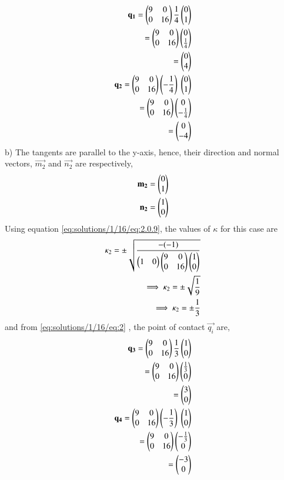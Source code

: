 \begin{align}
    \vec{q_1}=\myvec{9 & 0 \\ 0 & 16}\frac{1}{4}\myvec{0\\1}\\
    =\myvec{9 & 0 \\ 0 & 16}\myvec{0\\\frac{1}{4}}\\
    =\myvec{0\\4}\\
    \vec{q_2}=\myvec{9 & 0 \\ 0 & 16}\left(-\frac{1}{4}\right)\ \myvec{0\\1}\\
    =\myvec{9 & 0 \\ 0 & 16}\myvec{0\\-\frac{1}{4}}\\
    =\myvec{0\\-4}
\end{align}
b) The tangents are parallel to the y-axis, hence, their direction and normal vectors, $\vec{m_2}$ and $\vec{n_2}$ are respectively,
\begin{align}
\mathbf{m_2}=\begin{pmatrix}0\\1\end{pmatrix}\\
\mathbf{n_2}=\begin{pmatrix}1\\0\end{pmatrix}
\end{align}
Using equation \eqref{eq:solutions/1/16/eq:2.0.9}, the values of $\kappa$ for this case are
\begin{align}
     \kappa_2=\pm \sqrt{\frac{-(-1)}{\begin{pmatrix}1 & 0\end{pmatrix}\begin{pmatrix}9 & 0 \\ 0 & 16\end{pmatrix} \begin{pmatrix}1\\0\end{pmatrix}}}\\
 \implies \kappa_2=\pm \sqrt{\frac{1}{9}}\\
    \implies \kappa_2=\pm \frac{1}{3} 
\end{align}
and from \eqref{eq:solutions/1/16/eq:2} , the point of contact $\vec{q_i}$ are,
\begin{align}
\vec{q_3}=\myvec{9 & 0 \\ 0 & 16}\frac{1}{3}\myvec{1\\0}\\
    =\myvec{9 & 0 \\ 0 & 16}\myvec{\frac{1}{3}\\0}\\
    =\myvec{3\\0}\\
\vec{q_4}=\myvec{9 & 0 \\ 0 & 16}\left(-\frac{1}{3}\right)\ \myvec{1\\0}\\
    =\myvec{9 & 0 \\ 0 & 16}\myvec{-\frac{1}{3}\\0}\\
    =\myvec{-3\\0}
\end{align}
